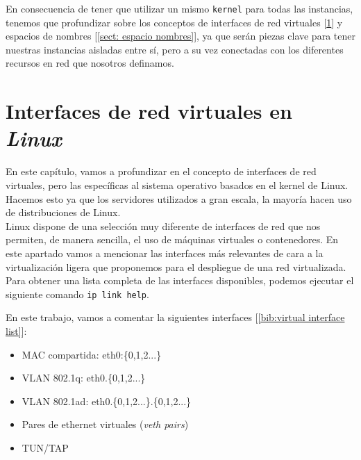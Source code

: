 \documentclass[12pt]{article}
\begin{document}
	\noindent En consecuencia de tener que utilizar un mismo \texttt{kernel} para todas las instancias, tenemos que profundizar sobre los conceptos de interfaces de red virtuales [\ref{sect: interfaces virtuales}] y espacios de nombres [\ref{sect: espacio nombres}], ya que serán piezas clave para tener nuestras instancias aisladas entre sí, pero a su vez conectadas con los diferentes recursos en red que nosotros definamos.
	
	\pagebreak
	
	\section{Interfaces de red virtuales en \textit{Linux}}
	\label{sect: interfaces virtuales}
	\noindent En este capítulo, vamos a profundizar en el concepto de interfaces de red virtuales, pero las específicas al sistema operativo basados en el kernel de Linux. Hacemos esto ya que los servidores utilizados a gran escala, la mayoría hacen uso de distribuciones de Linux. \\ %
	
	\noindent Linux dispone de una selección muy diferente de interfaces de red que nos permiten, de manera sencilla, el uso de máquinas virtuales o contenedores. En este apartado vamos a mencionar las interfaces más relevantes de cara a la virtualización ligera que proponemos para el despliegue de una red virtualizada. Para obtener una lista completa de las interfaces disponibles, podemos ejecutar el siguiente comando \texttt{ip link help}.\\
	
	\par \noindent En este trabajo, vamos a comentar la siguientes interfaces [\ref{bib:virtual interface list}]:
	\begin{itemize}
		\item MAC compartida: eth0:\{0,1,2...\}
		\item VLAN 802.1q: eth0.\{0,1,2...\}
		\item VLAN 802.1ad: eth0.\{0,1,2...\}.\{0,1,2...\}
		\item Pares de ethernet virtuales (\textit{veth pairs})
		\item TUN/TAP
	\end{itemize}
\end{document}
